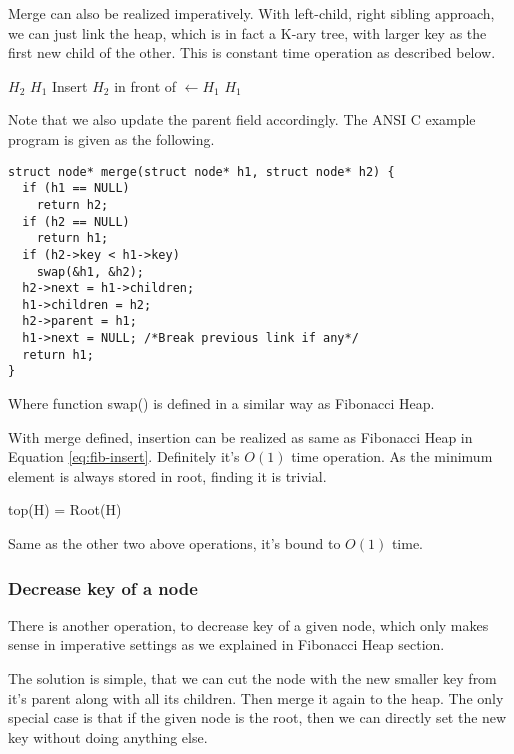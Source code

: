 \documentclass{article}
\begin{document}
Merge can also be realized imperatively. With left-child, right
sibling approach, we can just link the heap, which is in fact a
K-ary tree, with larger key as the first new child of the other.
This is constant time operation as described below.

\begin{algorithmic}[1]
    \State \Return $H_2$
  \EndIf
    \State \Return $H_1$
  \EndIf
    \State {}
  \EndIf
  \State Insert $H_2$ in front of 
  \State {} $\gets H_1$
  \State \Return $H_1$
\EndFunction
\end{algorithmic}

Note that we also update the parent field accordingly. The ANSI C
example program is given as the following.

\lstset{language=C}
\begin{lstlisting}
struct node* merge(struct node* h1, struct node* h2) {
  if (h1 == NULL)
    return h2;
  if (h2 == NULL)
    return h1;
  if (h2->key < h1->key)
    swap(&h1, &h2);
  h2->next = h1->children;
  h1->children = h2;
  h2->parent = h1;
  h1->next = NULL; /*Break previous link if any*/
  return h1;
}
\end{lstlisting}

Where function swap() is defined in a similar way as Fibonacci Heap.

With merge defined, insertion can be realized as same as Fibonacci Heap
in Equation \ref{eq:fib-insert}. Definitely it's $O(1)$ time operation.
As the minimum element is always stored in root, finding it is trivial.

\be
top(H) = Root(H)
\ee

Same as the other two above operations, it's bound to $O(1)$ time.

\subsubsection{Decrease key of a node}
There is another operation, to decrease key of a given node,
which only makes sense in imperative settings as we explained in Fibonacci
Heap section.

The solution is simple, that we can cut the node with the new smaller
key from it's parent along with all its children. Then merge it again
to the heap. The only special case is that if the given node is the
root, then we can directly set the new key without doing anything else.
\end{document}
